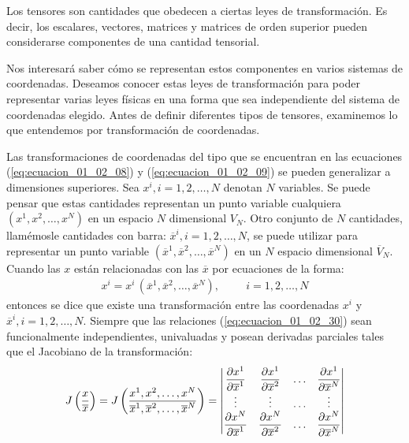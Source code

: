 \documentclass[hidelinks,12pt]{article}
\begin{document}
Los tensores son cantidades que obedecen a ciertas leyes de transformación. Es decir, los escalares, vectores, matrices y matrices de orden superior pueden considerarse componentes de una cantidad tensorial.
\par
Nos interesará saber cómo se representan estos componentes en varios sistemas de coordenadas. Deseamos conocer estas leyes de transformación para poder representar varias leyes físicas en una forma que sea independiente del sistema de coordenadas elegido. Antes de definir diferentes tipos de tensores, examinemos lo que entendemos por transformación de coordenadas.
\par
Las transformaciones de coordenadas del tipo que se encuentran en las ecuaciones (\ref{eq:ecuacion_01_02_08}) y (\ref{eq:ecuacion_01_02_09}) se pueden generalizar a dimensiones superiores. Sea $x^{i}, i = 1, 2,\ldots, N$ denotan $N$ variables. Se puede pensar que estas cantidades representan un punto variable cualquiera $(x^{1}, x^{2}, \ldots, x^{N})$ en un espacio $N$ dimensional $V_{N}$. Otro conjunto de $N$ cantidades, llamémosle cantidades con barra: $\overline{x}^{i}, i = 1,2, \ldots, N$, se puede utilizar para representar un punto variable $\left( \overline{x}^{1}, \overline{x}^{2}, \ldots, \overline{x}^{N} \right)$ en un $N$ espacio dimensional $\overline{V}_{N}$. Cuando las $x$ están relacionadas con las $\overline{x}$ por ecuaciones de la forma:
\begin{align}
x^{i} = x^{i} \, (\overline{x}^{1}, \overline{x}^{2}, \ldots, \overline{x}^{N}), \hspace{1cm} i = 1, 2, \ldots, N
\label{eq:ecuacion_01_02_30}
\end{align}
entonces se dice que existe una transformación entre las coordenadas $x^{i}$ y $\overline{x}^{i}, i = 1, 2, \ldots, N$. Siempre que las relaciones (\ref{eq:ecuacion_01_02_30}) sean funcionalmente independientes, univaluadas y posean derivadas parciales tales que el Jacobiano de la transformación:
\begin{align}
J \left( \dfrac{x}{\overline{x}} \right) = J \left( \dfrac{x^{1}, x^{2}, \ldots, x^{N}}{\overline{x}^{1}, \overline{x}^{2}, \ldots, \overline{x}^N} \right) = \mqty|
\displaystyle \pdv{x^{1}}{\overline{x}^{1}} & \displaystyle \pdv{x^{1}}{\overline{x}^{2}} & \ldots & \displaystyle \pdv{x^{1}}{\overline{x}^{N}} \\
\vdots & \vdots & \ldots & \vdots \\
\displaystyle \pdv{x^{N}}{\overline{x}^{1}} & \displaystyle \pdv{x^{N}}{\overline{x}^{2}} & \ldots & \displaystyle \pdv{x^{N}}{\overline{x}^{N}} |
\label{ec:ecuacion_01_02_31}
\end{align}
\end{document}

